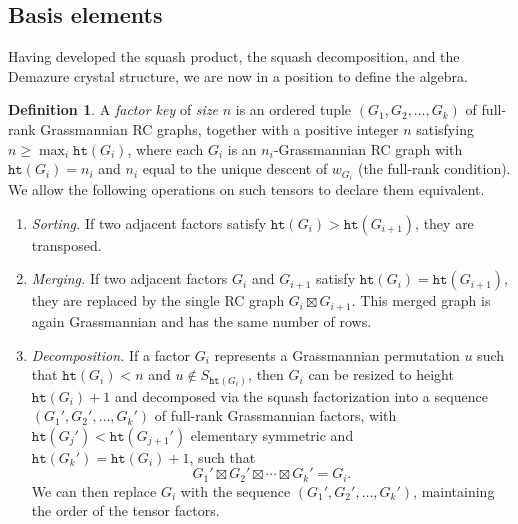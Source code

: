 \documentclass{amsart}
\theoremstyle{definition}
\newtheorem{definition}[lemma]{Definition}
\theoremstyle{remark}
\numberwithin{equation}{section}
\newcommand{\wof}[1]{w_{#1}}
\newcommand{\hr}{\mathtt{ht}}
\begin{document}
\subsection{Basis elements}

Having developed the squash product, the squash decomposition, and the Demazure crystal structure, we are now in a position to define the algebra.

\begin{definition}\label{definition:brfa}
A \textit{factor key} of \textit{size} $n$ is an ordered tuple $(G_1, G_2, \ldots, G_k)$ of full-rank Grassmannian RC graphs, together with a positive integer $n$ satisfying $n \geq \max_i \hr(G_i)$, where each $G_i$ is an $n_i$-Grassmannian RC graph with $\hr(G_i) = n_i$ and $n_i$ equal to the unique descent of $\wof{G_i}$ (the full-rank condition).  We allow the following operations on such tensors to declare them equivalent.
\end{definition}


\begin{enumerate}
\item \textit{Sorting.}  If two adjacent factors satisfy $\hr(G_i) > \hr(G_{i+1})$, they are transposed.

\item \textit{Merging.}  If two adjacent factors $G_i$ and $G_{i+1}$ satisfy $\hr(G_i) = \hr(G_{i+1})$, they are replaced by the single RC graph $G_i \boxtimes G_{i+1}$.  This merged graph is again Grassmannian and has the same number of rows.

\item \textit{Decomposition.}  If a factor $G_i$ represents a Grassmannian permutation $u$ such that $\hr(G_i) < n$ and $u\notin S_{\hr(G_i)}$, then $G_i$ can be resized to height $\hr(G_i)+1$ and decomposed via the squash factorization into a sequence $(G_1', G_2',\ldots, G_k')$ of full-rank Grassmannian factors, with $\hr(G_j')<\hr(G_{j+1}')$ elementary symmetric and $\hr(G_k')=\hr(G_i)+1$, such that 
$$G_1' \boxtimes G_2' \boxtimes \cdots \boxtimes G_k' = G_i.$$  
We can then replace $G_i$ with the sequence $(G_1', G_2',\ldots, G_k')$, maintaining the order of the tensor factors.
\end{enumerate}
\end{document}
